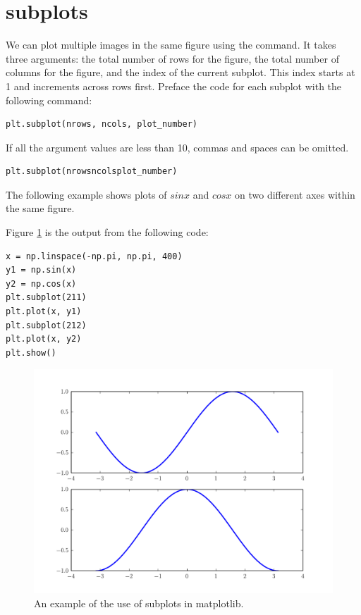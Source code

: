 \section*{subplots}

We can plot multiple images in the same figure using the  command.
It takes three arguments: the total number of rows for the figure, the total number of columns for the figure, and the index of the current subplot.
This index starts at 1 and increments across rows first.
Preface the code for each subplot with the following command:
\begin{lstlisting}
plt.subplot(nrows, ncols, plot_number)
\end{lstlisting}
If all the argument values are less than 10, commas and spaces can be omitted.
\begin{lstlisting}
plt.subplot(nrowsncolsplot_number)
\end{lstlisting}

The following example shows plots of $sin x$ and $cos x$ on two different axes within the same figure.

Figure \ref{fig:subplots} is the output from the following code:
\begin{lstlisting}
x = np.linspace(-np.pi, np.pi, 400)
y1 = np.sin(x)
y2 = np.cos(x)
plt.subplot(211)
plt.plot(x, y1)
plt.subplot(212)
plt.plot(x, y2)
plt.show()
\end{lstlisting}

\begin{figure}
\includegraphics[width=\textwidth]{subplots.pdf}
\caption{An example of the use of subplots in matplotlib.}
\label{fig:subplots}
\end{figure}

